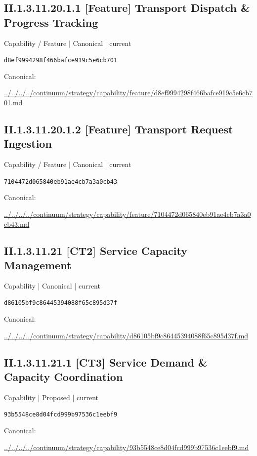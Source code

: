 \documentclass[10pt,a4paper]{article}
\begin{document}
\subsection*{II.1.3.11.20.1.1 [Feature] Transport Dispatch \& Progress Tracking}
{\small Capability / Feature | Canonical | current}\par
\texttt{d8ef9994298f466bafce919c5e6cb701}\par
Canonical: \par
{\footnotesize\url{../../../../continuum/strategy/capability/feature/d8ef9994298f466bafce919c5e6cb701.md}}\par
\subsection*{II.1.3.11.20.1.2 [Feature] Transport Request Ingestion}
{\small Capability / Feature | Canonical | current}\par
\texttt{7104472d065840eb91ae4cb7a3a0cb43}\par
Canonical: \par
{\footnotesize\url{../../../../continuum/strategy/capability/feature/7104472d065840eb91ae4cb7a3a0cb43.md}}\par
\subsection*{II.1.3.11.21 [CT2] Service Capacity Management}
{\small Capability | Canonical | current}\par
\texttt{d86105bf9c86445394088f65c895d37f}\par
Canonical: \par
{\footnotesize\url{../../../../continuum/strategy/capability/d86105bf9c86445394088f65c895d37f.md}}\par
\subsection*{II.1.3.11.21.1 [CT3] Service Demand \& Capacity Coordination}
{\small Capability | Proposed | current}\par
\texttt{93b5548ce8d04fcd999b97536c1eebf9}\par
Canonical: \par
{\footnotesize\url{../../../../continuum/strategy/capability/93b5548ce8d04fcd999b97536c1eebf9.md}}\par
\end{document}
